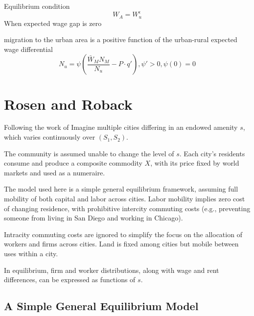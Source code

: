 \documentclass{article}
\numberwithin{equation}{section} %
\begin{document}
Equilibrium condition
\begin{equation}
  W_A=W_u^\epsilon
\end{equation}
When expected wage gap is zero

migration to the urban area is a positive function of the urban-rural expected wage differential
\begin{equation}
  N_u=\psi(\frac{\bar W_M N_M}{N_u}-P\cdot q'),\psi'>0,\psi(0)=0
\end{equation}




\section{Rosen and Roback} %
\label{sec:rosen_and_roback}

Following the work of 
Imagine multiple cities differing in an endowed amenity $s$, which varies continuously over $(S_1,S_2)$. 

The community is assumed unable to change the level of $s$. Each city’s residents consume and produce a composite commodity $X$, with its price fixed by world markets and used as a numeraire.

The model used here is a simple general equilibrium framework, assuming full mobility of both capital and labor across cities. Labor mobility implies zero cost of changing residence, with prohibitive intercity commuting costs (e.g., preventing someone from living in San Diego and working in Chicago). 

Intracity commuting costs are ignored to simplify the focus on the allocation of workers and firms across cities. Land is fixed among cities but mobile between uses within a city.

In equilibrium, firm and worker distributions, along with wage and rent differences, can be expressed as functions of $s$.







\subsection{A Simple General Equilibrium Model} %
\label{sub:a_simple_general_equilibrium_model}
\end{document}
